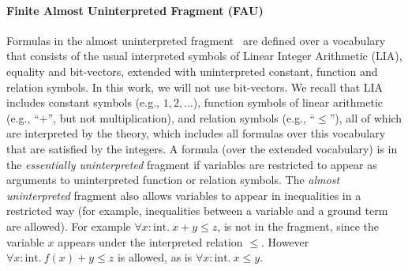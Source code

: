 
\paragraph{Finite Almost Uninterpreted Fragment (FAU)}
Formulas in the almost uninterpreted fragment~\cite{ge2009complete} are defined over a vocabulary that consists of the usual interpreted symbols of Linear Integer Arithmetic (LIA), equality and bit-vectors, extended with uninterpreted constant, function and relation symbols.
In this work, we will not use bit-vectors. We recall that LIA includes constant symbols (e.g., $1,2,\ldots$), function symbols of linear arithmetic (e.g., ``$+$'', but not multiplication), and relation symbols (e.g., ``$\leq$''), all of which are interpreted by the theory, which includes all formulas over this vocabulary that are satisfied by the integers.
A formula (over the extended vocabulary) is in the \emph{essentially uninterpreted} fragment if variables are restricted to appear as arguments to uninterpreted function or relation symbols.
The \emph{almost uninterpreted} fragment also allows variables to appear in inequalities in a restricted way (for example, inequalities between a variable and a ground term are allowed). For example $\forall x:\mbox{int}.\ x + y \leq z$, is not in the fragment, since the variable $x$ appears under the interpreted relation $\leq$. However $\forall x:\mbox{int}.\ f(x) + y \leq z$ is allowed, as is $\forall x:\mbox{int}.\ x \leq y$.

